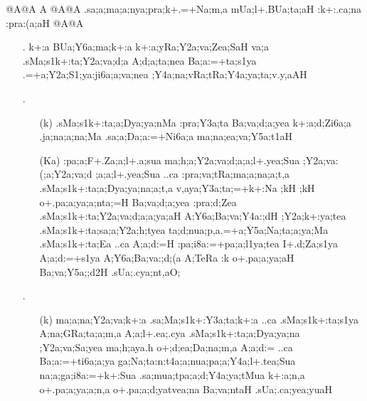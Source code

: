 \begin{spacing}{1.15}
{\sktf {}@A@A A @A@A .sa;a;ma;a;nya;pra;k+.=+Na;m,a
\ZF{-} mUa;l+.BUa;ta;aH :k+:.ca;na
:pra:(a;aH @A@A}

\begin{itemize}
  \item[{\sktf 1}.] {\sktf k+:a BUa;Y6a;ma;k+:a k+:a;yRa;Y2a;va;Zea;SaH
va;a .sMa;s1k+:ta;Y2a;va;d;a A;d;a;ta;nea
Ba;a:=+ta;s1ya .=+a;Y2a;S1;ya:ji6a;a;va;nea
;Y4a;na;vRa;tRa;Y4a;ya;ta;v.y,aAH }  
  
  \item[{\sktf 2}.] \begin{itemize} 
    \item[({\sktf k})] {\sktf .sMa;s1k+:ta;a;Dya;ya;nMa
:pra;Y3a;ta Ba;va;d;a;yea k+:a;d;Zi6a;a .ja;na;a;na;Ma .sa;a;Da;a:=+Ni6a;a
ma;na;ea;va;Y5a:t1aH }
                        
    \item[({\sktf Ka})] {\sktf :pa;a;F+.Za;a;l+.a;sua\ZF{,}
ma;h;a;Y2a;va;d;a;a;l+.yea;Sua\ZF{,} ;Y2a;va:(;a;Y2a;va;d%
;a;a;l+.yea;Sua ..ca :pra;va;tRa;ma;a;na;a;t,a
.sMa;s1k+:ta;a;Dya;ya;na;a;t,a v,aya;Y3a;ta;=+k+:Na\ZF{,} ;kH
;kH o+.pa;a;ya;a;nta;=H
Ba;va;d;a;yea :pra;d;Zea .sMa;s1k+:ta;Y2a;va;d;a;a;ya;aH
A;Y6a;Ba;va;Y4a:;dH ;Y2a;k+:ya;tea\ZF{,}
.sMa;s1k+:ta;sa;a;Y2a;h;tyea ta;d;nua;p,a.=+a;Y5a;Na;ta;a;ya;Ma .sMa;s1k+:ta;Ea ..ca
A;a;d:=H :pa;i8a:=+pa;a;l1ya;tea 
I+.d;Za;s1ya A;a;d:=+s1ya
A;Y6a;Ba;va:;d;(a A;TeRa
:k o+.pa;a;ya;aH Ba;va;Y5a;;d2H
.sUa;.cya;nt,aO; }
     \end{itemize}
                       
 \item[{\sktf 3}.] \begin{itemize}
      \item[({\sktf k})] {\sktf ma;a;na;Y2a;va;k+:a
.sa;Ma;s1k+:Y3a;ta;k+:a ..ca
.sMa;s1k+:ta;s1ya A;na;GRa;ta;a;m,a A;a;l+.ea;.cya\ZF{,}
.sMa;s1k+:ta;a;Dya;ya;na ;Y2a;va;Sa;yea ma;h;a}{\sktf ya.h} {\sktf o+;d;ea;Da;na;m,a A;a;d:= ..ca
Ba;a:=+ti6a;a;ya ga;Na;ta:n:t4a;a;nua;pa;a;Y4a;l+.tea;Sua
na;a;ga;i8a:=+k+:Sua .sa;mua;tpa;a;d;Y4a;ya;tMua k+:a;n,a
o+.pa;a;ya;a;n,a o+.pa;a;d;yatvea;na Ba;va;ntaH .sUa;.ca;yea;yuaH}
                      

\end{itemize}
\end{itemize}
\end{spacing}
